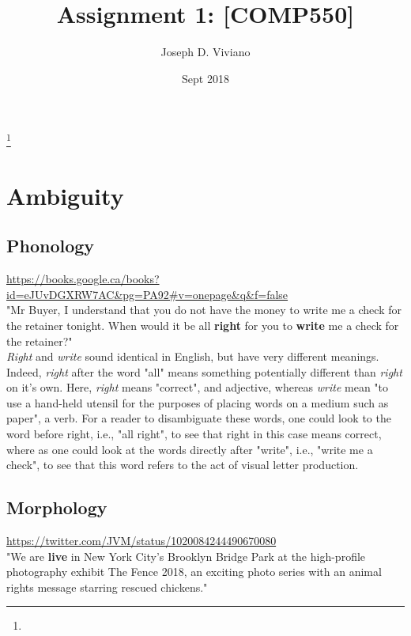\documentclass{amsart}
\theoremstyle{definition}
\theoremstyle{remark}
\numberwithin{equation}{section}
\begin{document}
\title{Assignment 1: [COMP550]}

\author{Joseph D. Viviano}
\address{McGill University}
\curraddr{}
\thanks{}
\date{Sept 2018}

\maketitle

\section{Ambiguity}

\subsection{Phonology}

\url{https://books.google.ca/books?id=eJUvDGXRW7AC&pg=PA92#v=onepage&q&f=false} \\

"Mr Buyer, I understand that you do not have the money to write me a check for the retainer tonight. When would it be all \textbf{right} for you to \textbf{write} me a check for the retainer?" \\

\textit{Right} and \textit{write} sound identical in English, but have very different meanings. Indeed, \textit{right} after the word "all" means something potentially different than \textit{right} on it's own. Here, \textit{right} means "correct", and adjective, whereas \textit{write} mean "to use a hand-held utensil for the purposes of placing words on a medium such as paper", a verb. For a reader to disambiguate these words, one could look to the word before right, i.e., "all right", to see that right in this case means correct, where as one could look at the words directly after "write", i.e., "write me a check", to see that this word refers to the act of visual letter production. \\

\subsection{Morphology}

\url{https://twitter.com/JVM/status/1020084244490670080} \\

"We are \textbf{live} in New York City’s Brooklyn Bridge Park at the high-profile photography exhibit The Fence 2018, an exciting photo series with an animal rights message starring rescued chickens." \\
\end{document}
